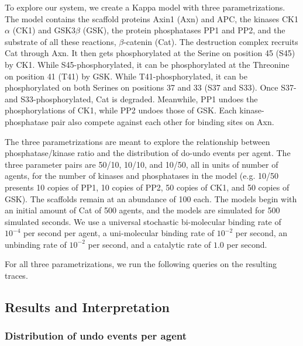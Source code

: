 To explore our system, we create a Kappa model with three
parametrizations. The model contains the scaffold proteins Axin1 (Axn)
and APC, the kinases CK1$\alpha$ (CK1) and GSK3$\beta$ (GSK), the
protein phosphatases PP1 and PP2, and the substrate of all these
reactions, $\beta$-catenin (Cat). The destruction complex recruits
Cat through Axn. It then gets phosphorylated at the Serine on position
45 (S45) by CK1. While S45-phosphorylated, it can be phosphorylated at
the Threonine on position 41 (T41) by GSK. While T41-phosphorylated,
it can be phosphorylated on both Serines on positions 37 and 33 (S37 and
S33). Once S37- and S33-phosphorylated, Cat is degraded. Meanwhile, PP1
undoes the phosphorylations of CK1, while PP2 undoes those of GSK. Each
kinase-phosphatase pair also compete against each other for binding sites
on Axn.

The three parametrizations are meant to explore the relationship
between phosphatase/kinase ratio and the distribution of do-undo
events per agent. The three parameter pairs are 50/10, 10/10, and
10/50, all in units of number of agents, for the number of kinases and
phosphatases in the model (e.g. 10/50 presents 10 copies of PP1, 10
copies of PP2, 50 copies of CK1, and 50 copies of GSK). The scaffolds
remain at an abundance of 100 each. The models begin with an initial
amount of Cat of 500 agents, and the models are simulated for 500
simulated seconds. We use a universal stochastic bi-molecular binding
rate of $10^{-4}$ per second per agent, a uni-molecular binding rate
of $10^{-2}$ per second, an unbinding rate of $10^{-2}$ per second,
and a catalytic rate of $1.0$ per second.

For all three parametrizations, we run the following queries on the
resulting traces.




\subsection{Results and Interpretation}

\subsubsection*{Distribution of undo events per agent}

